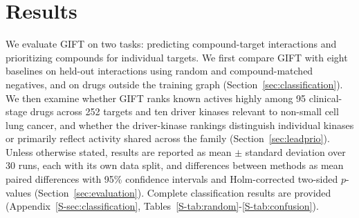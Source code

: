 \documentclass[10pt,letterpaper]{article}
\begin{document}
\section{Results}
\label{sec:results}
We evaluate GIFT on two tasks: predicting compound-target interactions and prioritizing compounds for individual targets. We first compare GIFT with eight baselines on held-out interactions using random and compound-matched negatives, and on drugs outside the training graph (Section~\ref{sec:classification}). We then examine whether GIFT ranks known actives highly among 95 clinical-stage drugs across 252 targets and ten driver kinases relevant to non-small cell lung cancer, and whether the driver-kinase rankings distinguish individual kinases or primarily reflect activity shared across the family (Section~\ref{sec:leadprio}). Unless otherwise stated, results are reported as mean $\pm$ standard deviation over 30 runs, each with its own data split, and differences between methods as mean paired differences with 95\% confidence intervals and Holm-corrected two-sided $p$-values (Section~\ref{sec:evaluation}). Complete classification results are provided (Appendix~\ref{S-sec:classification}, Tables~\ref{S-tab:random}-\ref{S-tab:confusion}).
\end{document}
